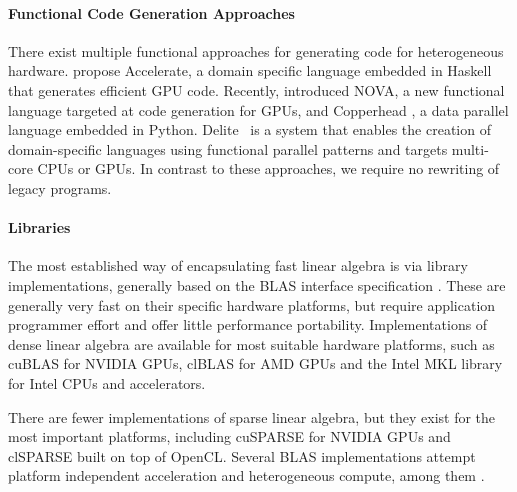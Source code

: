 \paragraph*{Functional Code Generation Approaches}
    There exist multiple functional approaches for generating code for
    heterogeneous hardware.
    \citet{chakravarty11accelerating,mcdonell13optimising} propose Accelerate,
    a domain specific language embedded in Haskell that generates efficient GPU
    code.
    Recently, \citet{collins14nova} introduced NOVA, a new functional language
    targeted at code generation for GPUs, and Copperhead
    \cite{catanzaro11copperhead}, a data parallel language embedded in Python.
    Delite~\cite{brown11heterogeneous,chafi11domain} is a system that enables
    the creation of domain-specific languages using functional parallel patterns
    and targets multi-core CPUs or GPUs.
    In contrast to these approaches, we require no rewriting of legacy programs.

\paragraph*{Libraries}
    The most established way of encapsulating fast linear algebra is via
    library implementations, generally based on the BLAS interface
    specification \cite{2002:USB:567806.567807}.
    These are generally very fast on their specific hardware platforms, but
    require application programmer effort and offer little performance portability.
    Implementations of dense linear algebra are available for most suitable
    hardware platforms, such as cuBLAS \cite{cublas} for NVIDIA GPUs, clBLAS
    \cite{clblas} for AMD GPUs and the Intel MKL library \cite{mkl} for Intel
    CPUs and accelerators.

    There are fewer implementations of sparse linear algebra, but they exist for
    the most important platforms, including cuSPARSE \cite{cusparse} for NVIDIA
    GPUs and clSPARSE \cite{clsparse} built on top of OpenCL.
    Several BLAS implementations attempt platform independent acceleration and
    heterogeneous compute, among them \citet{Wang:2016:BHP:2925426.2926256,
    10.1007/978-3-319-64203-1_33, Diego2017Multi}. 



